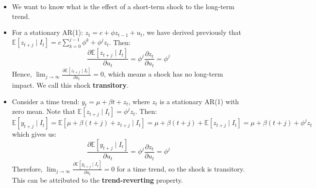 \documentclass[notitlepage]{article}
\begin{document}
\begin{itemize}

    \item We want to know what is the effect of a short-term shock to the long-term trend.

    \item For a stationary AR(1): \(z_t = c + \phi z_{t-1} + u_t\), we have derived previously that \(\mathbb{E}[z_{t+j}\mid I_t] = c \sum_{k=0}^{j-1} \phi^k + \phi^j z_t\). Then:
    \[
    \frac{\partial \mathbb{E}[z_{t+j}\mid I_t]}{\partial u_t} = \phi^j \frac{\partial z_t}{\partial u_t} = \phi^j
    \]
    Hence, \(\lim_{j\to\infty}\frac{\partial \mathbb{E}[z_{t+j}\mid I_t]}{\partial u_t} = 0\), which means a shock has no long-term impact. We call this shock \textbf{transitory}.

    \item Consider a time trend: \(y_t = \mu + \beta t + z_t\), where \(z_t\) is a stationary AR(1) with zero mean. Note that \(\mathbb{E}[z_{t+j}\mid I_t] = \phi^jz_t\). Then:
    \[
    \mathbb{E}[y_{t+j}\mid I_t] = \mathbb{E}[\mu + \beta (t+j) + z_{t+j} \mid I_t] = \mu + \beta (t+j) + \mathbb{E}[z_{t+j}\mid I_t] = \mu + \beta (t+j) + \phi^j z_t
    \]
    which gives us:
    \[
    \frac{\partial \mathbb{E}[y_{t+j}\mid I_t]}{\partial u_t} = \phi^j \frac{\partial z_t}{\partial u_t} = \phi^j
    \]
    Therefore, \(\lim_{j\to\infty}\frac{\partial \mathbb{E}[y_{t+j}\mid I_t]}{\partial u_t} = 0\) for a time trend, so the shock is transitory. This can be attributed to the \textbf{trend-reverting} property.


\end{itemize}
\end{document}
